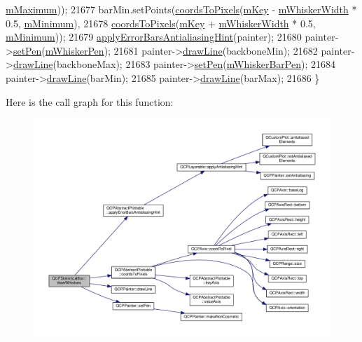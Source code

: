 \begin{DoxyCode}
      \hyperlink{class_q_c_p_statistical_box_a16266f1e0e4e8e95b5d141c49479ef2e}{mMaximum}));
21677   barMin.setPoints(\hyperlink{class_q_c_p_abstract_plottable_ade710a776104b14c1c835168ce1bfc5c}{coordsToPixels}(\hyperlink{class_q_c_p_statistical_box_a86fd1d3be5c5bc11d11eda7517069af4}{mKey} - \hyperlink{class_q_c_p_statistical_box_a4d166474f845d5db626e8b11a0815a6f}{mWhiskerWidth} * 0.5, 
      \hyperlink{class_q_c_p_statistical_box_a7143ece4e7e5f9ac010739fbc390bf0c}{mMinimum}),
21678                    \hyperlink{class_q_c_p_abstract_plottable_ade710a776104b14c1c835168ce1bfc5c}{coordsToPixels}(\hyperlink{class_q_c_p_statistical_box_a86fd1d3be5c5bc11d11eda7517069af4}{mKey} + \hyperlink{class_q_c_p_statistical_box_a4d166474f845d5db626e8b11a0815a6f}{mWhiskerWidth} * 0.5, 
      \hyperlink{class_q_c_p_statistical_box_a7143ece4e7e5f9ac010739fbc390bf0c}{mMinimum}));
21679   \hyperlink{class_q_c_p_abstract_plottable_af687bfe6160255960558eb71f1f81e73}{applyErrorBarsAntialiasingHint}(painter);
21680   painter->\hyperlink{class_q_c_p_painter_af9c7a4cd1791403901f8c5b82a150195}{setPen}(\hyperlink{class_q_c_p_statistical_box_a25b7552499f0f090fcff02858b2265a5}{mWhiskerPen});
21681   painter->\hyperlink{class_q_c_p_painter_a0b4b1b9bd495e182c731774dc800e6e0}{drawLine}(backboneMin);
21682   painter->\hyperlink{class_q_c_p_painter_a0b4b1b9bd495e182c731774dc800e6e0}{drawLine}(backboneMax);
21683   painter->\hyperlink{class_q_c_p_painter_af9c7a4cd1791403901f8c5b82a150195}{setPen}(\hyperlink{class_q_c_p_statistical_box_aa719b1d722a9f82364df1497a6dc1da8}{mWhiskerBarPen});
21684   painter->\hyperlink{class_q_c_p_painter_a0b4b1b9bd495e182c731774dc800e6e0}{drawLine}(barMin);
21685   painter->\hyperlink{class_q_c_p_painter_a0b4b1b9bd495e182c731774dc800e6e0}{drawLine}(barMax);
21686 \}
\end{DoxyCode}


Here is the call graph for this function\+:\nopagebreak
\begin{figure}[H]
\begin{center}
\leavevmode
\includegraphics[width=350pt]{class_q_c_p_statistical_box_a6f8d093ec7e404529388d02da4c72b34_cgraph}
\end{center}
\end{figure}




